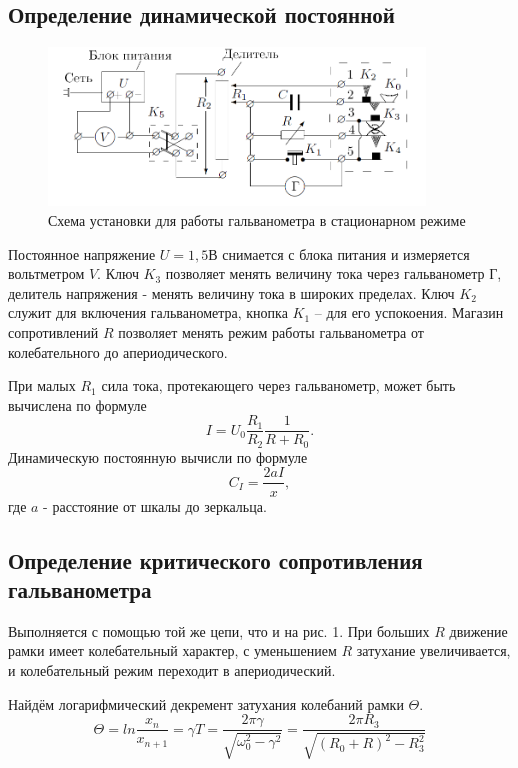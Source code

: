 \documentclass[a4paper]{article}
\begin{document}
\subsection{Определение динамической постоянной}
\begin{figure}[h]
    \centering
    \includegraphics[width=10cm]{fig1.PNG}
    \caption{Схема установки для работы гальванометра в стационарном режиме}
    \label{fig:vac}
\end{figure}
Постоянное напряжение $U = 1,5$В снимается с блока питания и измеряется вольтметром $V$. Ключ $K_3$ позволяет менять величину тока через гальванометр Г, делитель напряжения - менять величину тока в широких пределах. Ключ $K_2$ служит для включения гальванометра, кнопка $K_1$ -- для его успокоения. Магазин сопротивлений $R$ позволяет менять режим работы гальванометра от колебательного до апериодического. \par
При малых $R_1$ сила тока, протекающего через гальванометр, может быть вычислена по формуле 
\begin{equation}
    I = U_0 \frac{R_1}{R_2} \frac{1}{R + R_0}.
\end{equation}
Динамическую постоянную вычисли по формуле 
\begin{equation}
    C_I = \frac{2aI}{x},
\end{equation}
где $a$ - расстояние от шкалы до зеркальца.

\subsection{Определение критического сопротивления гальванометра}
Выполняется с помощью той же цепи, что и на рис. 1. При больших $R$ движение рамки имеет колебательный характер, с уменьшением $R$ затухание увеличивается, и колебательный режим переходит в апериодический. \par
Найдём логарифмический декремент затухания колебаний рамки  $\Theta$.
\begin{equation}
    \Theta = ln\frac{x_n}{x_{n+1}} = \gamma T = \frac{2\pi \gamma}{\sqrt{\omega_0^2 - \gamma^2}} = \frac{2\pi R_3}{\sqrt{(R_0 + R)^2 - R_3^2}}
\end{equation}
\end{document}
